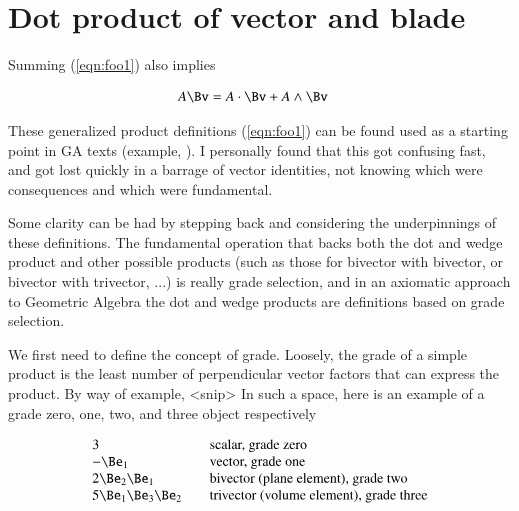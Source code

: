 %

\chapter{Dot product of vector and blade}
\label{chap:dotBlade}
{}
\date{Aug 11, 2009}

\beginArtWithToc



Summing (\ref{eqn:foo1}) also implies 

\begin{align}\label{eqn:foo2}
A \Bv &= A \cdot \Bv + A \wedge \Bv
\end{align}

These generalized product definitions (\ref{eqn:foo1}) can be found used as a starting point in GA texts (example, \citep{hestenes1999nfc}).  I personally found that this got confusing fast, and got lost quickly in a barrage of vector identities, not knowing which were consequences and which were fundamental.

Some clarity can be had by stepping back and considering the underpinnings of these definitions.  The fundamental operation that backs both the dot and wedge product and other possible products (such as those for bivector with bivector, or bivector with trivector, ...) is really grade selection, and in an
axiomatic approach to Geometric Algebra the dot and wedge products are definitions based on grade selection.

We first need to define the concept of grade.  Loosely, the grade of a simple product is the least number of perpendicular vector factors that can express the product.  By way of example, <snip>
In such a space, here is an example of a grade zero, one, two, and three object respectively

\begin{align*}
\begin{array}{l l}
3 & \quad \text{scalar, grade zero} \\
-\Be_1 & \quad \text{vector, grade one} \\
2 \Be_2 \Be_1 & \quad \text{bivector (plane element), grade two} \\
5 \Be_1 \Be_3 \Be_2 & \quad \text{trivector (volume element), grade three} \\
\end{array}
\end{align*}

